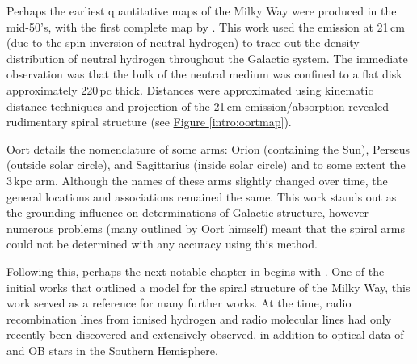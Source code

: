 		    Perhaps the earliest quantitative maps of the Milky Way were produced in the mid-50's, with the first complete map by \citet{Oort1958}. This work used the emission at 21\,cm (due to the spin inversion of neutral hydrogen) to trace out the density distribution of neutral hydrogen throughout the Galactic system. The immediate observation was that the bulk of the neutral medium was confined to a flat disk approximately 220\,pc thick. Distances were approximated using kinematic distance techniques and projection of the 21\,cm emission/absorption revealed rudimentary spiral structure (see \hyperref[intro:oortmap]{Figure \ref*{intro:oortmap}}). 
		    
		    Oort details the nomenclature of some arms: Orion (containing the Sun), Perseus (outside solar circle), and Sagittarius (inside solar circle) and to some extent the 3\,kpc arm. Although the names of these arms slightly changed over time, the general locations and associations remained the same. This work stands out as the grounding influence on determinations of Galactic structure, however numerous problems (many outlined by Oort himself) meant that the spiral arms could not be determined with any accuracy using this method.

		    Following this, perhaps the next notable chapter in begins with \citet{Georgelin1976}. One of the initial works that outlined a model for the spiral structure of the Milky Way, this work served as a reference for many further works. At the time, radio recombination lines from ionised hydrogen and radio molecular lines had only recently been discovered and extensively observed, in addition to optical data of \hii\space and OB stars in the Southern Hemisphere.
		    

